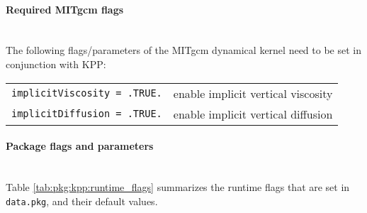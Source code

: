 \paragraph{Required MITgcm flags}
~ \\
%
The following flags/parameters of the MITgcm dynamical
kernel need to be set in conjunction with KPP:

\begin{tabular}{ll}
\texttt{implicitViscosity = .TRUE.} & enable implicit vertical viscosity \\
\texttt{implicitDiffusion = .TRUE.} & enable implicit vertical diffusion \\
\end{tabular}


\paragraph{Package flags and parameters}
~ \\
%
Table \ref{tab:pkg:kpp:runtime_flags} summarizes the
runtime flags that are set in \texttt{data.pkg}, and
their default values.


